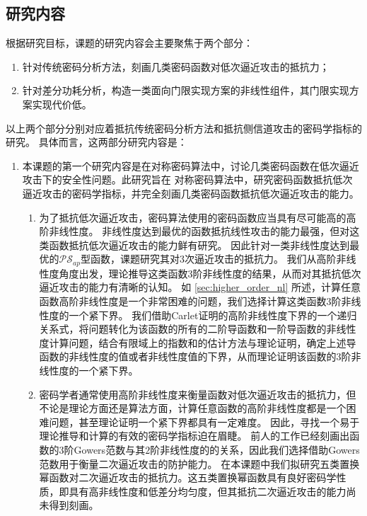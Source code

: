 \documentclass[a4paper,zihao=-4,AutoFakeBold]{ctexart}
\begin{document}
\subsection{研究内容}
根据研究目标，课题的研究内容会主要聚焦于两个部分：
\begin{enumerate}[label=\arabic{*})]
    \item 针对传统密码分析方法，刻画几类密码函数对低次逼近攻击的抵抗力；
    \item 针对差分功耗分析，构造一类面向门限实现方案的非线性组件，其门限实现方案实现代价低。
\end{enumerate}
以上两个部分分别对应着抵抗传统密码分析方法和抵抗侧信道攻击的密码学指标的研究。
具体而言，这两部分研究内容是：
\begin{enumerate}[label=(\arabic{*})]
    \item 本课题的第一个研究内容是在对称密码算法中，讨论几类密码函数在低次逼近攻击下的安全性问题。此研究旨在
    对称密码算法中，研究密码函数抵抗低次逼近攻击的密码学指标，并完全刻画几类密码函数抵抗低次逼近攻击的能力。
    \begin{enumerate}
        \item 为了抵抗低次逼近攻击，密码算法使用的密码函数应当具有尽可能高的高阶非线性度。
        非线性度达到最优的函数抵抗线性攻击的能力最强，但对这类函数抵抗低次逼近攻击的能力鲜有研究。
        因此针对一类非线性度达到最优的$\mathcal{PS}_{ap}$型函数，课题研究其对$3$次逼近攻击的抵抗力。
        我们从高阶非线性度角度出发，理论推导这类函数$3$阶非线性度的结果，从而对其抵抗低次逼近攻击的能力有清晰的认知。
        如 \ref{sec:higher_order_nl} 所述，计算任意函数高阶非线性度是一个非常困难的问题，我们选择计算这类函数$3$阶非线性度的一个紧下界。
        我们借助Carlet证明的高阶非线性度下界的一个递归关系式，将问题转化为该函数的所有的二阶导函数和一阶导函数的非线性度计算问题，结合有限域上的指数和的估计方法与理论证明，确定上述导函数的非线性度的值或者非线性度值的下界，从而理论证明该函数的$3$阶非线性度的一个紧下界。
        \item 密码学者通常使用高阶非线性度来衡量函数对低次逼近攻击的抵抗力，但不论是理论方面还是算法方面，计算任意函数的高阶非线性度都是一个困难问题，甚至理论证明一个紧下界都具有一定难度。
        因此，寻找一个易于理论推导和计算的有效的密码学指标迫在眉睫。
        前人的工作已经刻画出函数的$3$阶Gowers范数与其$2$阶非线性度的的关系，因此我们选择借助Gowers范数用于衡量二次逼近攻击的防护能力。
        在本课题中我们拟研究五类置换幂函数对二次逼近攻击的抵抗力。这五类置换幂函数具有良好密码学性质，即具有高非线性度和低差分均匀度，但其抵抗二次逼近攻击的能力尚未得到刻画。

\end{enumerate}
\end{enumerate}
\end{document}
